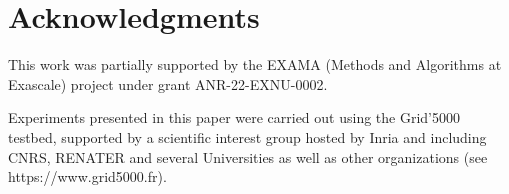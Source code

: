 \section*{Acknowledgments}
This work was partially supported by the EXAMA (Methods and Algorithms at Exascale) project under grant ANR-22-EXNU-0002.


Experiments presented in this paper were carried out using the Grid'5000 testbed, supported by a scientific interest group hosted by Inria and including CNRS, RENATER and several Universities as well as other organizations (see https://www.grid5000.fr).

